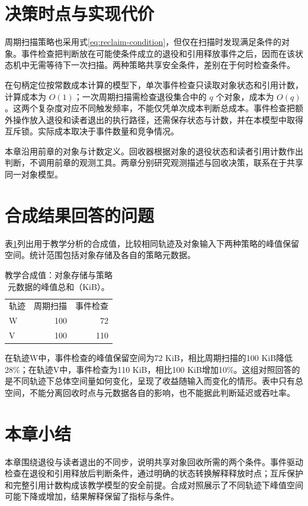 \section{决策时点与实现代价}
周期扫描策略也采用式\ref{eq:reclaim-condition}，但仅在扫描时发现满足条件的对象。事件检查把判断放在可能使条件成立的退役和引用释放事件之后，因而在该状态机中无需等待下一次扫描。两种策略共享安全条件，差别在于何时检查条件。

在句柄定位按常数成本计算的模型下，单次事件检查只读取对象状态和引用计数，计算成本为 $O(1)$；一次周期扫描需检查退役集合中的 $q$ 个对象，成本为 $O(q)$。这两个复杂度对应不同触发频率，不能仅凭单次成本判断总成本。事件检查把额外操作放入退役和读者退出的执行路径，还需保存状态与计数，并在本模型中取得互斥锁。实际成本取决于事件数量和竞争情况。

本章沿用前章的对象与计数定义。回收器根据对象的退役状态和读者引用计数作出判断，不调用前章的观测工具。两章分别研究观测描述与回收决策，联系在于共享同一对象模型。

\section{合成结果回答的问题}
表\ref{tab:synthetic-space}列出用于教学分析的合成值，比较相同轨迹及对象输入下两种策略的峰值保留空间。统计范围包括对象存储及各自的策略元数据。
\begin{table}[ht]
\centering
\caption{教学合成值：对象存储与策略元数据的峰值总和（KiB）。}
\label{tab:synthetic-space}
\begin{tabular}{lrr}
轨迹 & 周期扫描 & 事件检查 \\
W & 100 & 72 \\
V & 100 & 110
\end{tabular}
\end{table}

在轨迹W中，事件检查的峰值保留空间为72 KiB，相比周期扫描的100 KiB降低28\%；在轨迹V中，事件检查为110 KiB，相比100 KiB增加10\%。这组对照回答的是不同轨迹下总体空间量如何变化，呈现了收益随输入而变化的情形。表中只有总空间，不能分离回收时点与元数据各自的影响，也不能据此判断延迟或吞吐率。

\section{本章小结}
本章围绕退役与读者退出的不同步，说明共享对象回收所需的两个条件。事件驱动检查在退役和引用释放后判断条件，通过明确的状态转换解释释放时点；互斥保护和完整引用计数构成该教学模型的安全前提。合成对照展示了不同轨迹下峰值空间可能下降或增加，结果解释保留了指标与条件。
